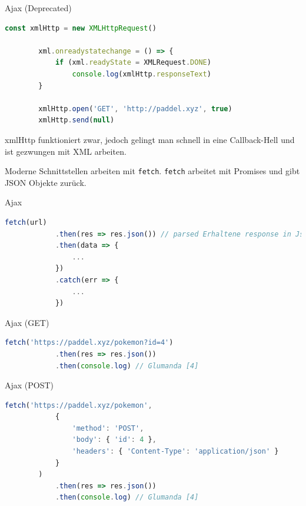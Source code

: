 \begin{example}{Ajax (Deprecated)}
    \begin{lstlisting}[language=JavaScript]
        const xmlHttp = new XMLHttpRequest()

        xml.onreadystatechange = () => {
            if (xml.readyState = XMLRequest.DONE)
                console.log(xmlHttp.responseText)
        }

        xmlHttp.open('GET', 'http://paddel.xyz', true)
        xmlHttp.send(null)
    \end{lstlisting}

    xmlHttp funktioniert zwar, jedoch gelingt man schnell in eine Callback-Hell und ist gezwungen mit XML arbeiten.

    Moderne Schnittstellen arbeiten mit \texttt{fetch}.
    \texttt{fetch} arbeitet mit Promises und gibt JSON Objekte zurück.
\end{example}

\begin{example}{Ajax}
    \begin{lstlisting}[language=JavaScript]
        fetch(url)
            .then(res => res.json()) // parsed Erhaltene response in Json
            .then(data => {
                ...
            })
            .catch(err => {
                ...
            })
    \end{lstlisting}
\end{example}

\begin{example}{Ajax (GET)}
    \begin{lstlisting}[language=JavaScript]
        fetch('https://paddel.xyz/pokemon?id=4')
            .then(res => res.json())
            .then(console.log) // Glumanda [4]
    \end{lstlisting}
\end{example}

\begin{example}{Ajax (POST)}
    \begin{lstlisting}[language=JavaScript]
        fetch('https://paddel.xyz/pokemon',
            {
                'method': 'POST',
                'body': { 'id': 4 },
                'headers': { 'Content-Type': 'application/json' }
            }
        )
            .then(res => res.json())
            .then(console.log) // Glumanda [4]
    \end{lstlisting}
\end{example}